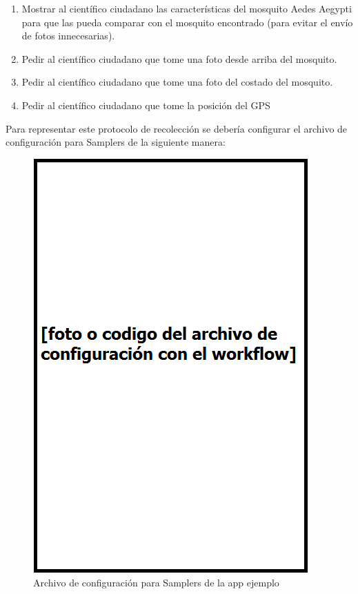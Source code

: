 \begin{enumerate}

\item Mostrar al científico ciudadano las características del mosquito Aedes Aegypti para que las pueda comparar con el mosquito encontrado (para evitar el envío de fotos innecesarias).

\item Pedir al científico ciudadano que tome una foto desde arriba del mosquito.

\item Pedir al científico ciudadano que tome una foto del costado del mosquito.

\item Pedir al científico ciudadano que tome la posición del GPS

\end{enumerate}

Para representar este protocolo de recolección se debería configurar el archivo de configuración para Samplers de la siguiente manera: 

\begin{figure}[H]
  \centering
    \includegraphics[scale=0.8]{05-implementacion/archivo_config_ejemplo.png} 
   \caption{Archivo de configuración para Samplers de la app ejemplo}
\end{figure}



